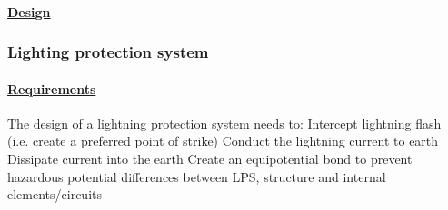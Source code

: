 \paragraph{\underline{Design}}


\subsubsection{Lighting protection system}
\paragraph{\underline{Requirements}}

The design of a lightning protection system needs to: Intercept lightning flash (i.e. create a preferred point of strike) Conduct the lightning current to earth Dissipate current into the earth Create an equipotential bond to prevent hazardous potential differences between LPS, structure and internal elements/circuits

